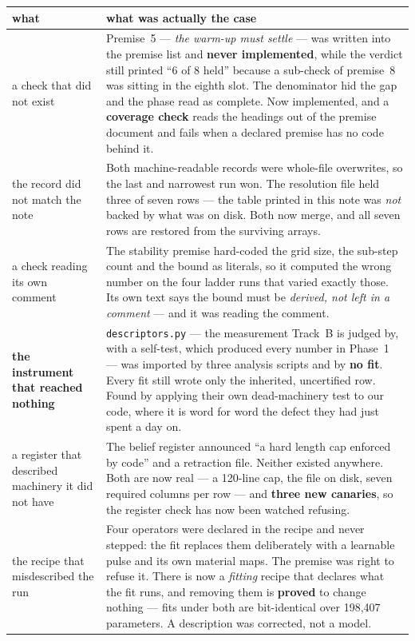 \documentclass[11pt,a4paper]{article}
\newcommand{\code}[1]{\texttt{#1}}
\begin{document}
\footnotesize
\begin{tabular}{@{}l p{10.9cm}@{}}
\toprule
\textbf{what} & \textbf{what was actually the case}\\
\midrule
a check that did not exist & Premise~5 --- \emph{the warm-up must settle} --- was written into the
premise list and \textbf{never implemented}, while the verdict still printed ``6 of 8 held''
because a sub-check of premise~8 was sitting in the eighth slot. The denominator hid the gap and
the phase read as complete. Now implemented, and a \textbf{coverage check} reads the headings out
of the premise document and fails when a declared premise has no code behind it.\\
the record did not match the note & Both machine-readable records were whole-file overwrites, so
the last and narrowest run won. The resolution file held three of seven rows --- the table printed
in this note was \emph{not} backed by what was on disk. Both now merge, and all seven rows are
restored from the surviving arrays.\\
a check reading its own comment & The stability premise hard-coded the grid size, the sub-step
count and the bound as literals, so it computed the wrong number on the four ladder runs that
varied exactly those. Its own text says the bound must be \emph{derived, not left in a comment} ---
and it was reading the comment.\\
\textbf{the instrument that reached nothing} & \code{descriptors.py} --- the measurement Track~B is
judged by, with a self-test, which produced every number in Phase~1 --- was imported by three
analysis scripts and by \textbf{no fit}. Every fit still wrote only the inherited, uncertified
row. Found by applying their own dead-machinery test to our code, where it is word for word the
defect they had just spent a day on.\\
a register that described machinery it did not have & The belief register announced ``a hard length
cap enforced by code'' and a retraction file. Neither existed anywhere. Both are now real --- a
120-line cap, the file on disk, seven required columns per row --- and \textbf{three new canaries},
so the register check has now been watched refusing.\\
the recipe that misdescribed the run & Four operators were declared in the recipe and never
stepped: the fit replaces them deliberately with a learnable pulse and its own material maps. The
premise was right to refuse it. There is now a \emph{fitting} recipe that declares what the fit
runs, and removing them is \textbf{proved} to change nothing --- fits under both are bit-identical
over 198{,}407 parameters. A description was corrected, not a model.\\
\bottomrule
\end{tabular}
\normalsize
\end{document}
